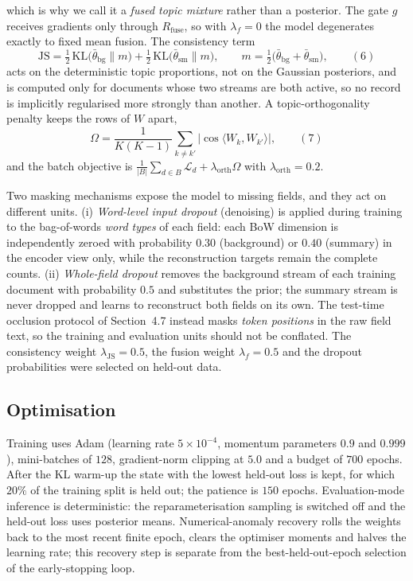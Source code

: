 \documentclass{article}
\begin{document}
which is why we call it a \emph{fused topic mixture} rather than a posterior. The gate
$g$ receives gradients only through $R_{\mathrm{fuse}}$, so with $\lambda_f=0$ the model
degenerates exactly to fixed mean fusion. The consistency term
\begin{equation}
\mathrm{JS}=\tfrac12\,\mathrm{KL}\!\big(\bar\theta_{\mathrm{bg}}\|m\big)
+\tfrac12\,\mathrm{KL}\!\big(\bar\theta_{\mathrm{sm}}\|m\big),
\qquad m=\tfrac12\big(\bar\theta_{\mathrm{bg}}+\bar\theta_{\mathrm{sm}}\big),
\qquad(6)\end{equation}
acts on the deterministic topic proportions, not on the Gaussian posteriors, and is computed only
for documents whose two streams are both active, so no record is implicitly regularised more
strongly than another. A topic-orthogonality penalty keeps the rows of $W$ apart,
\begin{equation}
\Omega=\frac{1}{K(K-1)}\sum_{k\neq k'}\big|\cos\langle W_k,W_{k'}\rangle\big|,
\qquad(7)\end{equation}
and the batch objective is $\frac{1}{|B|}\sum_{d\in B}\mathcal{L}_d
+\lambda_{\mathrm{orth}}\Omega$ with $\lambda_{\mathrm{orth}}=0.2$.

Two masking mechanisms expose the model to missing fields, and they act on different units.
(i) \emph{Word-level input dropout} (denoising) is applied during training to the bag-of-words
\emph{word types} of each field: each BoW dimension is independently zeroed with probability
$0.30$ (background) or $0.40$ (summary) in the encoder view only, while the reconstruction
targets remain the complete counts. (ii) \emph{Whole-field dropout} removes the background stream
of each training document with probability $0.5$ and substitutes the prior; the summary stream is
never dropped and learns to reconstruct both fields on its own. The test-time occlusion protocol
of Section~4.7 instead masks \emph{token positions} in the raw field text, so the
training and evaluation units should not be conflated. The consistency weight
$\lambda_{\mathrm{JS}}=0.5$, the fusion weight $\lambda_f=0.5$ and the dropout probabilities were
selected on held-out data.

\subsection{Optimisation}

Training uses Adam (learning rate $5\times10^{-4}$, momentum parameters $0.9$ and $0.999$),
mini-batches of $128$, gradient-norm clipping at $5.0$ and a budget of $700$ epochs. After the KL
warm-up the state with the lowest held-out loss is kept, for which $20\%$ of the training split is
held out; the patience is $150$ epochs. Evaluation-mode inference is deterministic: the
reparameterisation sampling is switched off and the held-out loss uses posterior means.
Numerical-anomaly recovery rolls the weights back to the most recent finite epoch, clears the
optimiser moments and halves the learning rate; this recovery step is separate from the
best-held-out-epoch selection of the early-stopping loop.
\end{document}
